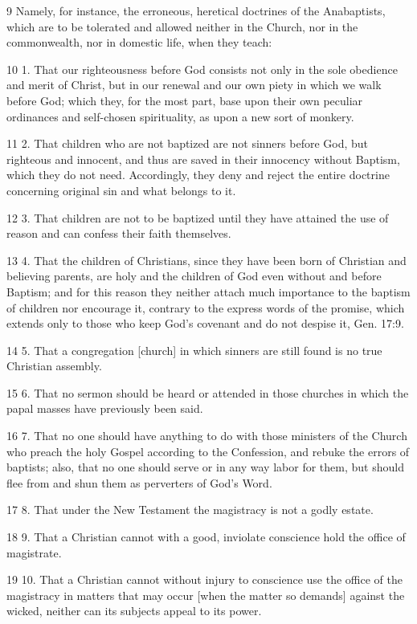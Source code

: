 {9 Namely, for instance, the erroneous, heretical doctrines of the Anabaptists, which are to be tolerated and allowed neither in the Church, nor in the commonwealth, nor in domestic life, when they teach:

10 1. That our righteousness before God consists not only in the sole obedience and merit of Christ, but in our renewal and our own piety in which we walk before God; which they, for the most part, base upon their own peculiar ordinances and self-chosen spirituality, as upon a new sort of monkery.

11 2. That children who are not baptized are not sinners before God, but righteous and innocent, and thus are saved in their innocency without Baptism, which they do not need. Accordingly, they deny and reject the entire doctrine concerning original sin and what belongs to it.

12 3. That children are not to be baptized until they have attained the use of reason and can confess their faith themselves.

13 4. That the children of Christians, since they have been born of Christian and believing parents, are holy and the children of God even without and before Baptism; and for this reason they neither attach much importance to the baptism of children nor encourage it, contrary to the express words of the promise, which extends only to those who keep God’s covenant and do not despise it, Gen. 17:9.

14 5. That a congregation [church] in which sinners are still found is no true Christian assembly.

15 6. That no sermon should be heard or attended in those churches in which the papal masses have previously been said.

16 7. That no one should have anything to do with those ministers of the Church who preach the holy Gospel according to the Confession, and rebuke the errors of baptists; also, that no one should serve or in any way labor for them, but should flee from and shun them as perverters of God’s Word.

17 8. That under the New Testament the magistracy is not a godly estate.

18 9. That a Christian cannot with a good, inviolate conscience hold the office of magistrate.

19 10. That a Christian cannot without injury to conscience use the office of the magistracy in matters that may occur [when the matter so demands] against the wicked, neither can its subjects appeal to its power.

}
